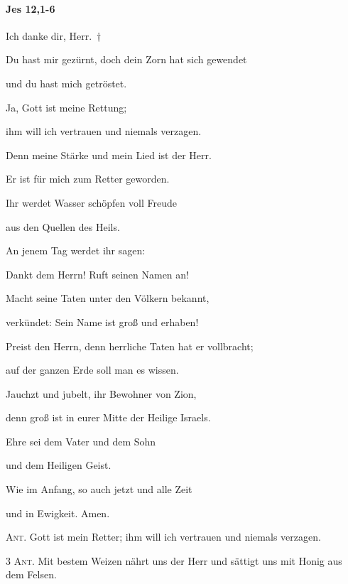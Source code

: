 \paragraph{Jes 12,1-6}

\noindent Ich danke dir, Herr.~†~\nopagebreak

Du hast mir gezürnt, doch dein Zorn hat sich gewendet~\GreStar{}~\nopagebreak

und du hast mich getröstet.

\noindent Ja, Gott ist meine Rettung;~\GreStar{}~\nopagebreak

ihm will ich vertrauen und niemals verzagen.

\noindent Denn meine Stärke und mein Lied ist der Herr.~\GreStar{}~\nopagebreak

Er ist für mich zum Retter geworden.

\noindent Ihr werdet Wasser schöpfen voll Freude~\GreStar{}~\nopagebreak

aus den Quellen des Heils.

\noindent An jenem Tag werdet ihr sagen:~\GreStar{}~\nopagebreak

Dankt dem Herrn! Ruft seinen Namen an!

\noindent Macht seine Taten unter den Völkern bekannt,~\GreStar{}~\nopagebreak

verkündet: Sein Name ist groß und erhaben!

\noindent Preist den Herrn, denn herrliche Taten hat er vollbracht;~\GreStar{}~\nopagebreak

auf der ganzen Erde soll man es wissen.

\noindent Jauchzt und jubelt, ihr Bewohner von Zion,~\GreStar{}~\nopagebreak

denn groß ist in eurer Mitte der Heilige Israels.

\noindent Ehre sei dem Vater und dem Sohn~\GreStar{}~\nopagebreak

und dem Heiligen Geist.

\noindent Wie im Anfang, so auch jetzt und alle Zeit~\GreStar{}~\nopagebreak

und in Ewigkeit. Amen.

\vspace{10pt}

\noindent \textsc{Ant.} Gott ist mein Retter; ihm will ich vertrauen und niemals verzagen. 

\vspace{10pt}

\noindent \textsc{3 Ant.} Mit bestem Weizen nährt uns der Herr und sättigt uns mit Honig aus dem Felsen.


